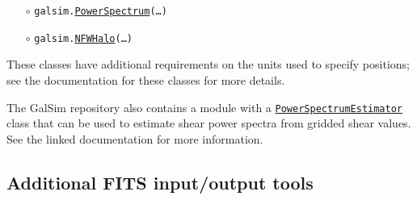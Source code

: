 \documentclass[preprint,10pt]{../../devel/modules/aastex}
\begin{document}
\begin{itemize}
\item[$\circ$]
  \texttt{galsim.}\href{http://galsim-developers.github.io/GalSim/classgalsim_1_1lensing__ps_1_1_power_spectrum.html}{\texttt{PowerSpectrum}}\texttt{(\dots)}

\item[$\circ$]
  \texttt{galsim.}\href{http://galsim-developers.github.io/GalSim/classgalsim_1_1nfw__halo_1_1_n_f_w_halo.html}{\texttt{NFWHalo}}\texttt{(\dots)}
\end{itemize}

These classes have additional requirements on the units used to specify
positions; see the documentation for these classes for more details.

The GalSim repository also contains a module with a
\href{http://galsim-developers.github.io/GalSim/classgalsim_1_1pse_1_1_power_spectrum_estimator.html}{\texttt{PowerSpectrumEstimator}} class that can be used to estimate shear power
spectra from gridded shear values.  See the linked documentation for more information.

\subsection{Additional FITS input/output tools}\label{sect:multifits}
\end{document}
